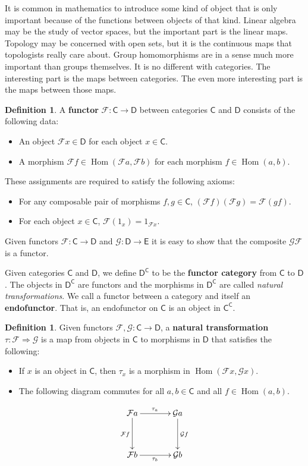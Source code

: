 \documentclass[MS, xcolor=dvipsnames]{wfuthesis}
\def\sC{\mathsf{C}}
\def\sD{\mathsf{D}}
\def\sE{\mathsf{E}}
\def\cF{\mathcal{F}}
\def\cG{\mathcal{G}}
\DeclareMathOperator{\Hom}{Hom}
\theoremstyle{definition}
\newtheorem{definition}[theorem]{Definition}
\begin{document}
It is common in mathematics to introduce some kind of object that is only important because of the functions between objects of that kind. Linear algebra may be the study of vector spaces, but the important part is the linear maps. Topology may be concerned with open sets, but it is the continuous maps that topologists really care about. Group homomorphisms are in a sense much more important than groups themselves. It is no different with categories. The interesting part is the maps between categories. The even more interesting part is the maps between those maps.
\begin{definition}
  A \textbf{functor} $\cF: \sC \to \sD$ between categories $\sC$ and $\sD$ consists of the following data:
  \begin{itemize}
    \item An object $\cF x \in \sD$ for each object $x \in \sC$.
    \item A morphism $\cF f \in \Hom(\cF a,\cF b)$ for each morphism $f \in \Hom(a,b)$.
  \end{itemize}
  These assignments are required to satisfy the following axioms:
  \begin{itemize}
    \item For any composable pair of morphisms $f,g \in \sC$, $(\cF f) (\cF g) = \cF(gf)$.
    \item For each object $x \in \sC$, $\cF(1_x) = 1_{\cF x}$.
  \end{itemize}
  Given functors $\cF: \sC \to \sD$ and $\cG: \sD \to \sE$ it is easy to show that the composite $\cG \cF$ is a functor.
\end{definition}
Given categories $\sC$ and $\sD$, we define $\sD^\sC$ to be the \textbf{functor category} from $\sC$ to $\sD$. The objects in $\sD^\sC$ are functors and the morphisms in $\sD^\sC$ are called \emph{natural transformations}. We call a functor between a category and itself an \textbf{endofunctor}. That is, an endofunctor on $\sC$ is an object in $\sC^\sC$.
\begin{definition}
  Given functors $\cF, \cG: \sC \to \sD$, a \textbf{natural transformation} $\tau: \cF \Rightarrow \cG$ is a map from objects in $\sC$ to morphisms in $\sD$ that satisfies the following:
  \begin{itemize}
    \item If $x$ is an object in $\sC$, then $\tau_x$ is a morphism in $\Hom(\cF x, \cG x)$.
    \item The following diagram commutes for all $a,b \in \sC$ and all $f \in \Hom(a,b)$.
  \end{itemize}
  \[ \SelectTips{cm}{}\xymatrix@R+1pc@C+1pc{
      \cF a \ar[r]^{\tau_a} \ar[d]_{\cF f} & \cG a \ar[d]^{\cG f} \\ \cF b \ar[r]_{\tau_b} & \cG b
  } \]
\end{definition}
\end{document}
